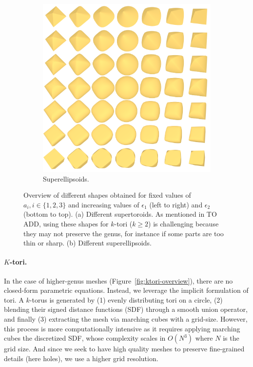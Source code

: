 \begin{figure}[t]
\begin{subfigure}[t]{0.48\linewidth}
    \includegraphics[width=\linewidth]{figs/topogen/ellipsoids_overview.png}
    \caption{Superellipsoids.}
    \label{fig:ellipsoids-overview}
  \end{subfigure}
  \caption{Overview of different shapes obtained for fixed values of $a_i, i \in \{1, 2, 3\}$ and increasing values of $\epsilon_1$ (left to right) and $\epsilon_2$ (bottom to top). 
  (a) Different supertoroids. As mentioned in TO ADD, using these shapes for $k$-tori ($k \geq 2$) is challenging because they may not preserve the genus, for instance if some parts are too thin or sharp. 
  (b) Different superellipsoids.}
  \label{fig:overview}
\end{figure}

\paragraph{$K$-tori.} In the case of higher-genus meshes (Figure~\ref{fig:ktori-overview}), there are no closed-form parametric equations. Instead, we leverage the implicit formulation of tori. A $k$-torus is generated by (1) evenly distributing tori on a circle, (2) blending their signed distance functions (SDF) through a smooth union operator, and finally (3) extracting the mesh via marching cubes with a grid-size. However, this process is more computationally intensive as it requires applying marching cubes the discretized SDF, whose complexity scales in $O(N^3)$ where $N$ is the grid size. And since we seek to have high quality meshes to preserve fine-grained details (here holes), we use a higher grid resolution.

